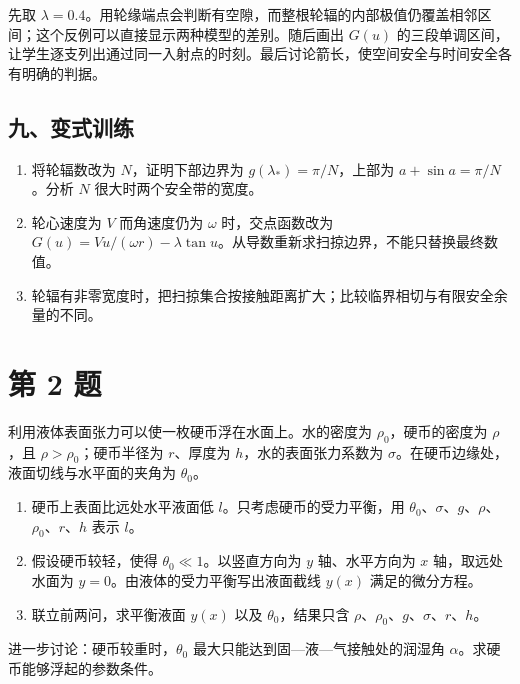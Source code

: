 \documentclass[12pt,a4paper,UTF8]{ctexart}
\newcommand{\tightlist}{\setlength{\itemsep}{0pt}\setlength{\parskip}{0pt}}
\begin{document}
先取
\(\lambda=0.4\)。用轮缘端点会判断有空隙，而整根轮辐的内部极值仍覆盖相邻区间；这个反例可以直接显示两种模型的差别。随后画出
\(G(u)\)
的三段单调区间，让学生逐支列出通过同一入射点的时刻。最后讨论箭长，使空间安全与时间安全各有明确的判据。

\subsection{九、变式训练}\label{ux4e5dux53d8ux5f0fux8badux7ec3}

\begin{enumerate}
\def\labelenumi{\arabic{enumi}.}
\tightlist
\item
  将轮辐数改为 \(N\)，证明下部边界为 \(g(\lambda_*)=\pi/N\)，上部为
  \(a+\sin a=\pi/N\)。分析 \(N\) 很大时两个安全带的宽度。
\item
  轮心速度为 \(V\) 而角速度仍为 \(\omega\) 时，交点函数改为
  \(G(u)=Vu/(\omega r)-\lambda\tan u\)。从导数重新求扫掠边界，不能只替换最终数值。
\item
  轮辐有非零宽度时，把扫掠集合按接触距离扩大；比较临界相切与有限安全余量的不同。
\end{enumerate}

\newpage

\section{第 2 题}\label{ux7b2c-2-ux9898}

利用液体表面张力可以使一枚硬币浮在水面上。水的密度为
\(\rho_0\)，硬币的密度为 \(\rho\)，且 \(\rho>\rho_0\)；硬币半径为
\(r\)、厚度为 \(h\)，水的表面张力系数为
\(\sigma\)。在硬币边缘处，液面切线与水平面的夹角为 \(\theta_0\)。

\begin{enumerate}
\def\labelenumi{\arabic{enumi}.}
\tightlist
\item
  硬币上表面比远处水平液面低 \(l\)。只考虑硬币的受力平衡，用
  \(\theta_0\)、\(\sigma\)、\(g\)、\(\rho\)、\(\rho_0\)、\(r\)、\(h\)
  表示 \(l\)。
\item
  假设硬币较轻，使得 \(\theta_0\ll1\)。以竖直方向为 \(y\) 轴、水平方向为
  \(x\) 轴，取远处水面为 \(y=0\)。由液体的受力平衡写出液面截线 \(y(x)\)
  满足的微分方程。
\item
  联立前两问，求平衡液面 \(y(x)\) 以及 \(\theta_0\)，结果只含
  \(\rho\)、\(\rho_0\)、\(g\)、\(\sigma\)、\(r\)、\(h\)。
\end{enumerate}

进一步讨论：硬币较重时，\(\theta_0\)
最大只能达到固---液---气接触处的润湿角
\(\alpha\)。求硬币能够浮起的参数条件。
\end{document}
